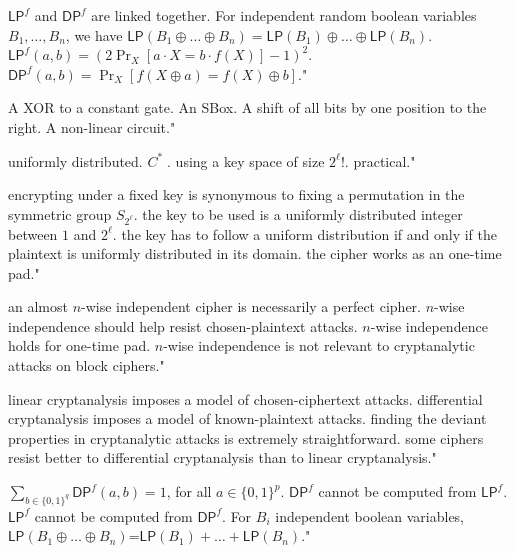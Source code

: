 {$\mathsf{LP}^f$ and $\mathsf{DP}^f$ are linked together.}
{For independent random boolean variables $B_1, \dots, B_n$, we have $\mathsf{LP}(B_1\oplus \dots \oplus B_n) = \mathsf{LP}(B_1) \oplus \dots \oplus \mathsf{LP}(B_n)$.}
{$\mathsf{LP}^f(a,b) = \left( 2 \Pr_X\left[ a\cdot X = b\cdot f(X) \right] -1 \right)^2$.}
{$\mathsf{DP}^f(a,b) = \Pr_X\left[ f(X\oplus a) = f(X) \oplus b \right]$."}

{A XOR to a constant gate.}
{An SBox.}
{A shift of all bits by one position to the right.}
{A non-linear circuit."}

{uniformly distributed.}
{$C^*\;$.}
{using a key space of size $2^\ell!$.}
{practical."}

{encrypting under a fixed key is synonymous to fixing a permutation in the symmetric group $S_{2^{\ell}}$.}
{the key to be used is a uniformly distributed integer between $1$ and $2^\ell$.}
{the key has to follow a uniform distribution if and only if the plaintext is uniformly distributed in its domain.}
{the cipher works as an one-time pad."}

{an almost $n$-wise independent cipher is necessarily a perfect cipher.}
{$n$-wise independence should help resist chosen-plaintext attacks.}
{$n$-wise independence holds for one-time pad.}
{$n$-wise independence is not relevant to cryptanalytic attacks on block ciphers."}

{linear cryptanalysis imposes a model of chosen-ciphertext attacks.}
{differential cryptanalysis imposes a model of known-plaintext attacks.}
{finding the deviant properties in cryptanalytic attacks is extremely straightforward.}
{some ciphers resist better to differential cryptanalysis than to linear cryptanalysis."}

{$\displaystyle\sum_{b\in\{0,1\}^q} \mathsf{DP}^f(a,b)=1$, for all $a \in \{0,1\}^p$.}
{$\mathsf{DP}^f$ cannot be computed from $\mathsf{LP}^f$.}
{$\mathsf{LP}^f$ cannot be computed from $\mathsf{DP}^f$.}
{For $B_i$ independent boolean variables, $\mathsf{LP}(B_1 \oplus \ldots \oplus B_n)$=$\mathsf{LP}(B_1) + \ldots + \mathsf{LP}(B_n)$."}

